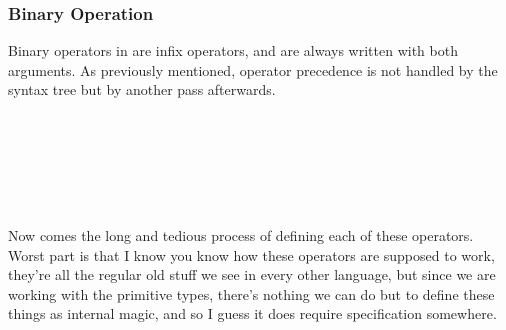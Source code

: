 \subsubsection{Binary Operation}
\label{sec:binop}

Binary operators in \Poetry{} are infix operators, and are always written
with both arguments. As previously mentioned, operator precedence is not
handled by the syntax tree but by another pass afterwards.

\begin{bnf*}
     \\
     \\
    \bnfmore{
        \bnfts{\op{==}}
        \bnfor
        \bnfts{\op{===}}
        \bnfor
        \bnfts{\op{<}}
        \bnfor
        \bnfts{\op{>}}
        \bnfor
        \bnfts{\op{>=}}
        \bnfor
        \bnfts{\op{<=}}
        \bnfor
    } \\
    \bnfmore{
        \bnfts{\op{\&}}
        \bnfor
        \bnfts{\op{|}}
        \bnfor
        \bnfts{\op{\textasciicircum}}
        \bnfor
        \bnfts{\op{<\textasciitilde}}
        \bnfor
        \bnfts{\op{\textasciitilde>}}
        \bnfor
        \bnfts{\op{,}}
        \bnfor
        \bnfts{\op{:}}
        \bnfor
    } \\
    \bnfmore{
        \bnfts{\op{<>}}
        \bnfor
        \bnfts{\op{>>}}
        \bnfor
        \bnfts{\op{<<}}
        \bnfor
        \bnfts{\op{|>}}
        \bnfor
        \bnfts{\op{<|}}
    } \\
\end{bnf*}

Now comes the long and tedious process of defining each of these operators.
Worst part is that I know you know how these operators are supposed to work,
they're all the regular old stuff we see in every other language, but since
we are working with the primitive types, there's nothing we can do but to
define these things as internal magic, and so I guess it does require
specification somewhere.

